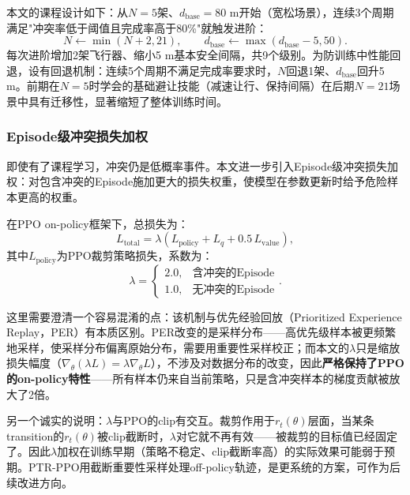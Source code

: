 \documentclass[12pt,a4paper,UTF8]{ctexart}
\begin{document}
本文的课程设计如下：从$N=5$架、$d_{\text{base}}=80$ m开始（宽松场景），连续3个周期满足"冲突率低于阈值且完成率高于80\%"就触发进阶：
\begin{equation}
    N \leftarrow \min(N+2, 21), \qquad d_{\text{base}} \leftarrow \max(d_{\text{base}}-5, 50).
    \label{eq:curriculum}
\end{equation}
每次进阶增加2架飞行器、缩小5 m基本安全间隔，共9个级别。为防训练中性能回退，设有回退机制：连续5个周期不满足完成率要求时，$N$回退1架、$d_{\text{base}}$回升5 m。前期在$N=5$时学会的基础避让技能（减速让行、保持间隔）在后期$N=21$场景中具有迁移性，显著缩短了整体训练时间。

\subsubsection{Episode级冲突损失加权}

即使有了课程学习，冲突仍是低概率事件。本文进一步引入Episode级冲突损失加权：对包含冲突的Episode施加更大的损失权重，使模型在参数更新时给予危险样本更高的权重。

在PPO\cite{ref30} on-policy框架下，总损失为：
\begin{equation}
    L_{\text{total}} = \lambda\left(L_{\text{policy}} + L_{q} + 0.5\,L_{\text{value}}\right),
    \label{eq:total_loss}
\end{equation}
其中$L_{\text{policy}}$为PPO裁剪策略损失，系数为：
\begin{equation}
    \lambda = \begin{cases}
        2.0, & \text{含冲突的Episode}\\
        1.0, & \text{无冲突的Episode}
    \end{cases}.
    \label{eq:lambda}
\end{equation}

这里需要澄清一个容易混淆的点：该机制与优先经验回放（Prioritized Experience Replay，PER）有本质区别。PER改变的是采样分布——高优先级样本被更频繁地采样，使采样分布偏离原始分布，需要用重要性采样校正；而本文的$\lambda$只是缩放损失幅度（$\nabla_\theta(\lambda L)=\lambda\nabla_\theta L$），不涉及对数据分布的改变，因此\textbf{严格保持了PPO的on-policy特性}——所有样本仍来自当前策略，只是含冲突样本的梯度贡献被放大了2倍。

另一个诚实的说明：$\lambda$与PPO的clip有交互。裁剪作用于$r_t(\theta)$层面，当某条transition的$r_t(\theta)$被clip截断时，$\lambda$对它就不再有效——被裁剪的目标值已经固定了。因此$\lambda$加权在训练早期（策略不稳定、clip截断率高）的实际效果可能弱于预期。PTR-PPO\cite{ref27}用截断重要性采样处理off-policy轨迹，是更系统的方案，可作为后续改进方向。
\end{document}
